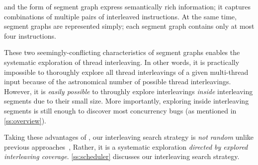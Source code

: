%
%
%
\Intcov and the form of segment graph express semantically rich
information; it captures combinations of multiple pairs of interleaved
instructions. At the same time, segment graphs are represented simply;
each segment graph contains only at most four instructions.

These two seemingly-conflicting characteristics of segment graphs
enables the systematic exploration of thread interleaving.
%
In other words, it is practically impossible to thoroughly explore all
thread interleavings of a given multi-thread input because of the
astronomical number of possible thread interleavings.
%
However, it is \textit{easily possible} to throughly explore
interleavings \textit{inside} interleaving segments due to their small
size. More importantly, exploring inside interleaving segments is
still enough to discover most concurrency bugs (as mentioned in
\autoref{ss:overview}).

Taking these advantages of \intcov, our interleaving search strategy
is \textit{not random} unlike previous approaches~\cite{krace, ski,
  pctalgorithm, muzz}, Rather, it is a systematic exploration
\textit{directed by explored interleaving coverage}.
%
\autoref{ss:scheduler} discusses our interleaving search strategy.






